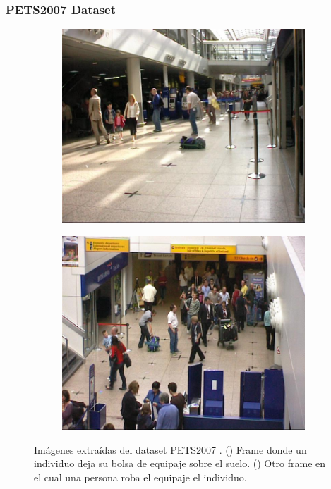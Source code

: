 \newpage

\subsubsection{PETS2007 Dataset}

\begin{figure}[ht]
  \centering
  \begin{subfigure}[b]{0.4\textwidth}
    \includegraphics[width=\textwidth]{img/chapters/resultados/bases-datos/pets2007_1.jpeg}
    \caption{}
    \label{fig:pets2007_1}
  \end{subfigure}
  \qquad\qquad
  \begin{subfigure}[b]{0.4\textwidth}
    \includegraphics[width=\textwidth]{img/chapters/resultados/bases-datos/pets2007_2.jpeg}
    \caption{}
    \label{fig:pets2007_2}
  \end{subfigure}
  \caption{Imágenes extraídas del dataset PETS2007 \cite{pets2007-dataset}.
    (\protect{}) Frame donde un individuo deja su bolsa de equipaje sobre el suelo.
    (\protect{}) Otro frame en el cual una persona roba el equipaje el individuo.}
  \label{fig:pets2007}
\end{figure}

